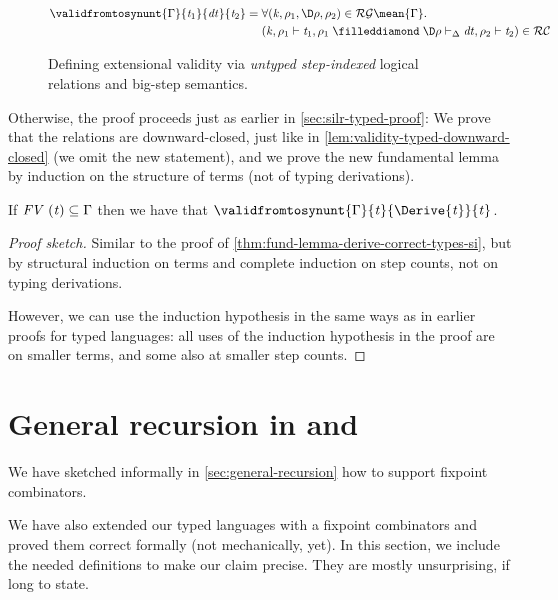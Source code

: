 \begin{figure}[h!]
\begin{align*}
  \ensuremath{\validfromtosynunt{\Gamma}{\Varid{t}_{1}}{\Varid{dt}}{\Varid{t}_{2}}} ={}&
                                      \ensuremath{\forall (\Varid{k},\rho_{1},\D\rho,\rho_{2})\in \mathcal{RG}\mean{\Gamma}\hsforall \hsdot{\circ }{\mathpunct{.}}\\&(\Varid{k},\rho_{1}\vdash\Varid{t}_{1},\rho_{1}\mathrel{\filleddiamond}\D\rho\vdash_{\Delta}\Varid{dt},\rho_{2}\vdash\Varid{t}_{2})\in \mathcal{RC}}
\end{align*}
\caption{Defining extensional validity via \emph{untyped step-indexed} logical relations and big-step semantics.}
\label{fig:big-step-validity-ext-si-untyped}
\end{figure}

Otherwise, the proof proceeds just as earlier in
\cref{sec:silr-typed-proof}: We prove that the relations are
downward-closed, just like in \cref{lem:validity-typed-downward-closed}
(we omit the new statement), and we prove the new fundamental
lemma by induction on the structure of terms (not of typing derivations).
\begin{theorem}
  \label{thm:fund-lemma-derive-correct-untyped-si}
  If \ensuremath{\Conid{FV}\;(\Varid{t})\subseteq\Gamma} then we have that \ensuremath{\validfromtosynunt{\Gamma}{\Varid{t}}{\Derive{\Varid{t}}}{\Varid{t}}}.
\end{theorem}
\begin{proof}[Proof sketch]
  Similar to the proof of
\cref{thm:fund-lemma-derive-correct-types-si}, but by structural
induction on terms and complete induction on step counts, not on
typing derivations.

However, we can use the induction hypothesis in the same ways as
in earlier proofs for typed languages: all uses of the induction
hypothesis in the proof are on smaller terms, and some also at
smaller step counts.
\end{proof}

\section{General recursion in \ilcTau{} and \dilcTau}
\label{sec:bos-fixpoints}


We have sketched informally in \cref{sec:general-recursion} how to support
fixpoint combinators.

We have also extended our typed languages with a
fixpoint combinators and proved them correct formally (not
mechanically, yet). In this section, we include the needed
definitions to make our claim precise. They are mostly
unsurprising, if long to state.

